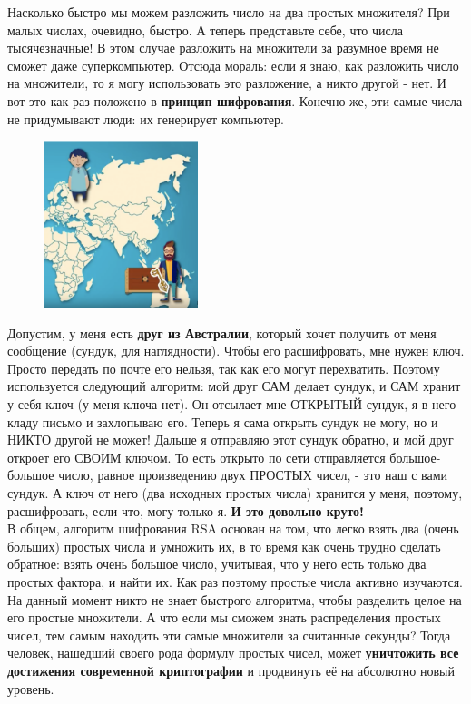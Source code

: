 \hspace{20} Насколько быстро мы можем разложить число на два простых множителя? При малых числах, очевидно, быстро. А теперь представьте себе, что числа тысячезначные! В этом случае разложить на множители за разумное время не сможет даже суперкомпьютер. Отсюда мораль: если я знаю, как разложить число на множители, то я могу использовать это разложение, а никто другой - нет. И вот это как раз положено в \textbf{принцип шифрования}. Конечно же, эти самые числа не придумывают люди: их генерирует компьютер. 

\newline \hspace{20}
\begin{figure}
 \vspace{-25pt}
  \begin{center}
    \includegraphics[width=0.4\textwidth]{australia.png}
  \end{center}
   \vspace{-20pt}
\end{figure}
Допустим, у меня есть \textbf{друг из Австралии}, который хочет получить от меня сообщение (сундук, для наглядности).
Чтобы его расшифровать, мне нужен ключ. Просто передать по почте его нельзя, так как его могут перехватить. Поэтому используется следующий алгоритм: мой друг САМ делает сундук, и САМ хранит у себя ключ (у меня ключа нет). Он отсылает мне ОТКРЫТЫЙ сундук, я в него кладу письмо и захлопываю его. Теперь я сама открыть сундук не могу, но и НИКТО другой не может! Дальше я отправляю этот сундук обратно, и мой друг откроет его СВОИМ ключом. 
То есть открыто по сети отправляется большое-большое число, равное произведению двух ПРОСТЫХ чисел, - это наш с вами сундук. А ключ от него (два исходных простых числа) хранится у меня, поэтому, расшифровать, если что, могу только я.\textbf{ И это довольно круто!}\\


\hspace{20}В общем, алгоритм шифрования RSA основан на том, что легко взять два (очень больших) простых числа и умножить их, в то время как очень трудно сделать обратное: взять очень большое число, учитывая, что у него есть только два простых фактора, и найти их. Как раз поэтому простые числа активно изучаются. На данный момент никто не знает быстрого алгоритма, чтобы разделить целое на его простые множители. А что если мы сможем знать распределения простых чисел, тем самым находить эти самые множители за считанные секунды? Тогда человек, нашедший своего рода формулу простых чисел, может \textbf{уничтожить все достижения современной криптографии} и продвинуть её на абсолютно новый уровень.

